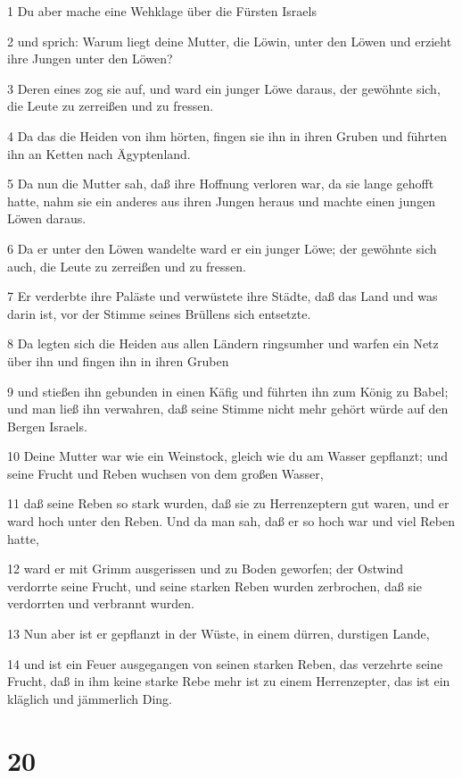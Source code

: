 \par 1 Du aber mache eine Wehklage über die Fürsten Israels
\par 2 und sprich: Warum liegt deine Mutter, die Löwin, unter den Löwen und erzieht ihre Jungen unter den Löwen?
\par 3 Deren eines zog sie auf, und ward ein junger Löwe daraus, der gewöhnte sich, die Leute zu zerreißen und zu fressen.
\par 4 Da das die Heiden von ihm hörten, fingen sie ihn in ihren Gruben und führten ihn an Ketten nach Ägyptenland.
\par 5 Da nun die Mutter sah, daß ihre Hoffnung verloren war, da sie lange gehofft hatte, nahm sie ein anderes aus ihren Jungen heraus und machte einen jungen Löwen daraus.
\par 6 Da er unter den Löwen wandelte ward er ein junger Löwe; der gewöhnte sich auch, die Leute zu zerreißen und zu fressen.
\par 7 Er verderbte ihre Paläste und verwüstete ihre Städte, daß das Land und was darin ist, vor der Stimme seines Brüllens sich entsetzte.
\par 8 Da legten sich die Heiden aus allen Ländern ringsumher und warfen ein Netz über ihn und fingen ihn in ihren Gruben
\par 9 und stießen ihn gebunden in einen Käfig und führten ihn zum König zu Babel; und man ließ ihn verwahren, daß seine Stimme nicht mehr gehört würde auf den Bergen Israels.
\par 10 Deine Mutter war wie ein Weinstock, gleich wie du am Wasser gepflanzt; und seine Frucht und Reben wuchsen von dem großen Wasser,
\par 11 daß seine Reben so stark wurden, daß sie zu Herrenzeptern gut waren, und er ward hoch unter den Reben. Und da man sah, daß er so hoch war und viel Reben hatte,
\par 12 ward er mit Grimm ausgerissen und zu Boden geworfen; der Ostwind verdorrte seine Frucht, und seine starken Reben wurden zerbrochen, daß sie verdorrten und verbrannt wurden.
\par 13 Nun aber ist er gepflanzt in der Wüste, in einem dürren, durstigen Lande,
\par 14 und ist ein Feuer ausgegangen von seinen starken Reben, das verzehrte seine Frucht, daß in ihm keine starke Rebe mehr ist zu einem Herrenzepter, das ist ein kläglich und jämmerlich Ding.

\chapter{20}

